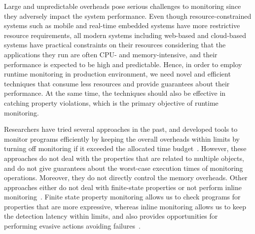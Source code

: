 Large and unpredictable overheads pose serious challenges to monitoring since 
they adversely impact the system performance.
Even though resource-constrained systems such as mobile and real-time embedded 
systems have more restrictive resource requirements, all modern systems 
including
web-based and cloud-based systems have practical constraints on their resources 
considering that the applications they run are often CPU- and memory-intensive, 
and their performance is expected to be high and predictable. Hence, in order to 
employ runtime monitoring in production environment, we need novel and efficient 
techniques that consume less resources and provide guarantees about their 
performance. At the same time, the techniques should also be effective in 
catching property violations, which is the primary objective of runtime 
monitoring.

Researchers have tried several approaches in the past, and developed tools to 
monitor programs efficiently by keeping the overall overheads within limits by 
turning off monitoring if it exceeded the allocated time budget~\cite{}. 
However, these approaches do not deal with the properties that are related to 
multiple objects, and do not give guarantees about the worst-case execution 
times of monitoring operations. Moreover, they do not directly control the 
memory overheads. Other approaches either do not deal with finite-state 
properties or not perform inline monitoring~\cite{}. Finite state property 
monitoring allows us to check programs for properties that are more expressive, 
whereas inline monitoring allows us to keep the detection latency within limits, 
and also provides opportunities for performing evasive actions avoiding 
failures~\cite{}.

